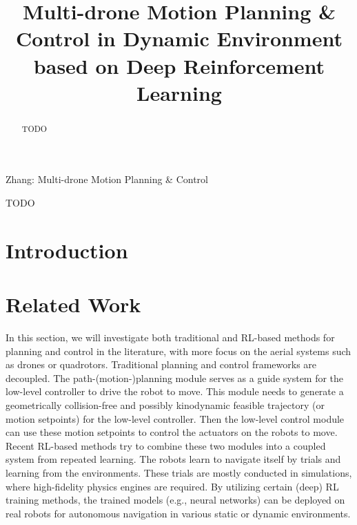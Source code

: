 \documentclass[letterpaper,journal,twoside]{IEEEtran}
\begin{document}
\title{Multi-drone Motion Planning \& Control in Dynamic Environment based on Deep Reinforcement Learning}

\author{
}

\maketitle

\begingroup
\renewcommand\thefootnote{\IEEEauthorrefmark{1}}
\endgroup

%
{Zhang: Multi-drone Motion Planning \& Control}



\begin{abstract}
TODO
\end{abstract}

\begin{IEEEkeywords}
  TODO
\end{IEEEkeywords}

\section{Introduction}

\section{Related Work}

In this section, we will investigate both traditional and RL-based methods for planning and control in the literature, with more focus on the aerial systems such as drones or quadrotors.
Traditional planning and control frameworks are decoupled.
The path-(motion-)planning module serves as a guide system for the low-level controller to drive the robot to move. 
This module needs to generate a geometrically collision-free and possibly kinodynamic feasible trajectory (or motion setpoints) for the low-level controller.
Then the low-level control module can use these motion setpoints to control the actuators on the robots to move.
Recent RL-based methods try to combine these two modules into a coupled system from repeated learning. 
The robots learn to navigate itself by trials and learning from the environments.
These trials are mostly conducted in simulations, where high-fidelity physics engines are required. 
By utilizing certain (deep) RL training methods, the trained models (e.g., neural networks) can be deployed on real robots for autonomous navigation in various static or dynamic environments.
\end{document}
